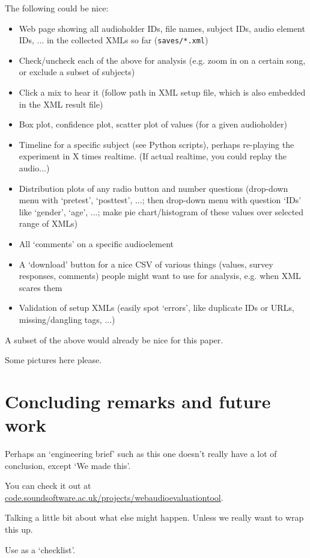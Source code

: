 \documentclass{sig-alternate}
\begin{document}
	The following could be nice: 
	
	\begin{itemize}
		\item Web page showing all audioholder IDs, file names, subject IDs, audio element IDs, ... in the collected XMLs so far (\texttt{saves/*.xml})
		\item Check/uncheck each of the above for analysis (e.g. zoom in on a certain song, or exclude a subset of subjects)
		\item Click a mix to hear it (follow path in XML setup file, which is also embedded in the XML result file)
		\item Box plot, confidence plot, scatter plot of values (for a given audioholder)
		\item Timeline for a specific subject (see Python scripts), perhaps re-playing the experiment in X times realtime. (If actual realtime, you could replay the audio...)
		\item Distribution plots of any radio button and number questions (drop-down menu with `pretest', `posttest', ...; then drop-down menu with question `IDs' like `gender', `age', ...; make pie chart/histogram of these values over selected range of XMLs)
		\item All `comments' on a specific audioelement
		\item A `download' button for a nice CSV of various things (values, survey responses, comments) people might want to use for analysis, e.g. when XML scares them
		\item Validation of setup XMLs (easily spot `errors', like duplicate IDs or URLs, missing/dangling tags, ...)
	\end{itemize}

	A subset of the above would already be nice for this paper. 
	
	Some pictures here please. 

\section{Concluding remarks and future work}
	Perhaps an `engineering brief' such as this one doesn't really have a lot of conclusion, except `We made this'. 
	
	You can check it out at \url{code.soundsoftware.ac.uk/projects/webaudioevaluationtool}. 
	
	Talking a little bit about what else might happen. Unless we really want to wrap this up. 

	Use \cite{schoeffler2015mushra} as a `checklist'.

%

%
%
\end{document}
